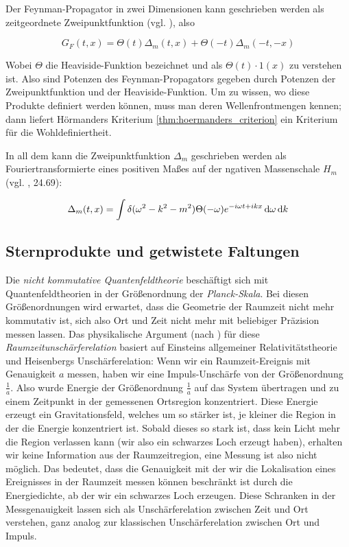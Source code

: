 Der Feynman-Propagator in zwei Dimensionen kann geschrieben werden als zeitgeordnete Zweipunktfunktion (vgl. \textcite{ReedSimon}), also

\begin{equation}
    G_F(t,x)
    =
    \Theta (t)\Delta_m(t,x) + \Theta(-t)\Delta_m(-t,-x)
    \label{eq:feynman_propgator_as_product}
\end{equation}

Wobei $\Theta$ die Heaviside-Funktion bezeichnet und als $\Theta(t) \cdot 1(x)$ zu verstehen ist. Also sind Potenzen des Feynman-Propagators gegeben durch Potenzen der Zweipunktfunktion und der Heaviside-Funktion. Um zu wissen, wo diese Produkte definiert werden können, muss man deren Wellenfrontmengen kennen; dann liefert Hörmanders Kriterium \ref{thm:hoermanders_criterion} ein Kriterium für die Wohldefiniertheit.

In all dem kann die Zweipunktfunktion $\Delta_m$ geschrieben werden als Fouriertransformierte eines positiven Maßes auf der ngativen Massenschale $H_m$ (vgl. \textcite{Schwartz2014}, 24.69):

\begin{equation}
    \Delta_m (t,x) = \int \delta (\omega^2-k^2-m^2)
                    \Theta(-\omega)e^{-i\omega t + i k x} \mathop{}\!\mathrm{d} \omega \mathop{}\!\mathrm{d} k
\label{eq:delta_m}
\end{equation}

\subsection{Sternprodukte und getwistete Faltungen}
Die \emph{nicht kommutative Quantenfeldtheorie} beschäftigt sich mit Quantenfeldtheorien in der Größenordnung der \emph{Planck-Skala}. Bei diesen Größenordnungen wird erwartet, dass die Geometrie der Raumzeit nicht mehr kommutativ ist, sich also Ort und Zeit nicht mehr mit beliebiger Präzision messen lassen. Das physikalische Argument (nach \textcite{Doplicher1995}) für diese \emph{Raumzeitunschärferelation} basiert auf Einsteins allgemeiner Relativitätstheorie und Heisenbergs Unschärferelation: Wenn wir ein Raumzeit-Ereignis mit Genauigkeit $a$ messen, haben wir eine Impuls-Unschärfe von der Größenordnung $\frac{1}{a}$. Also wurde Energie der Größenordnung $\frac{1}{a}$ auf das System übertragen und zu einem Zeitpunkt in der gemessenen Ortsregion konzentriert. Diese Energie erzeugt ein Gravitationsfeld, welches um so stärker ist, je kleiner die Region in der die Energie konzentriert ist. Sobald dieses so stark ist, dass kein Licht mehr die Region verlassen kann (wir also ein schwarzes Loch erzeugt haben), erhalten wir keine Information aus der Raumzeitregion, eine Messung ist also nicht möglich. Das bedeutet, dass die Genauigkeit mit der wir die Lokalisation eines Ereignisses in der Raumzeit messen können beschränkt ist durch die Energiedichte, ab der wir ein schwarzes Loch erzeugen. Diese Schranken in der Messgenauigkeit lassen sich als Unschärferelation zwischen Zeit und Ort verstehen, ganz analog zur klassischen Unschärferelation zwischen Ort und Impuls.


